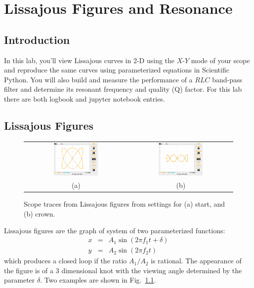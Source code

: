 \chapter{Lissajous Figures and Resonance}


\section{Introduction}

In this lab, you'll view Lissajous curves in 2-D using the $X$-$Y$ mode of your scope and reproduce the same curves using parameterized equations in Scientific Python. You will also  build and measure the performance of a $RLC$ band-pass filter and determine its resonant frequency and quality (Q) factor. For this lab there are both logbook and jupyter notebook entries.

\section{Lissajous Figures}

\begin{figure}[htbp]
\begin{center}
\begin{tabular}{cc}
\includegraphics[width=0.45\textwidth]{figs/labs/lissajous/scope_lissajous.jpg} & 
\includegraphics[width=0.45\textwidth]{figs/labs/lissajous/scope_crown.jpg} \\
(a) & (b) \\
\end{tabular}
\caption{Scope traces from Lissajous figures from settings for (a) start, and (b) crown.}
\label{fig:tracelissajous}
\end{center}
\end{figure}
Lissajous figures are the graph of system of two parameterized functions:
\begin{eqnarray*}
x &=& A_1 \sin(2 \pi f_1 t + \delta) \\
y &=& A_2 \sin(2 \pi f_2 t) 
\end{eqnarray*}
which produces a closed loop if the ratio $A_1 / A_2$ is rational.  The appearance of the figure is of a 3 dimensional knot with the viewing angle determined by the parameter $\delta$.  Two examples are shown in Fig.~\ref{fig:tracelissajous}.

